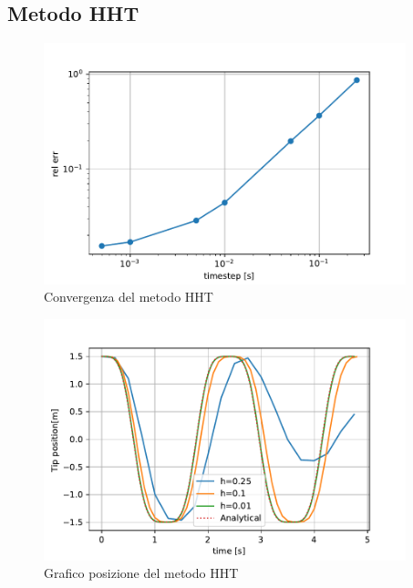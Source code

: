 \FloatBarrier
\subsection{Metodo HHT}

\begin{figure}[h!]
\centering
\includegraphics[height=7cm]{Figure/Convergenza/HHT_err.pdf}
\caption{Convergenza del metodo HHT}
 \label{fig:HHT_err}
\end{figure}

\begin{figure}[h!]
\centering
\includegraphics[height=7cm]{Figure/Convergenza/HHT_pos.pdf}
\caption{Grafico posizione del metodo HHT}
 \label{fig:HHT_pos}
\end{figure}
\FloatBarrier

